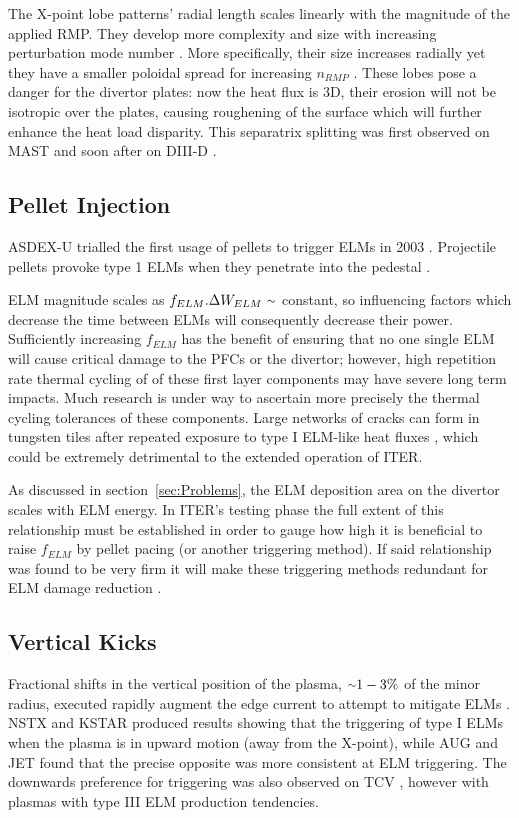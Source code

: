 \documentclass[12pt]{article}  %
\providecommand{\squiggle}{\raise.17ex\hbox{$\scriptstyle\sim$}} %
\begin{document}
The X-point lobe patterns' radial length scales linearly with the magnitude of the applied RMP. They develop more complexity and size with increasing perturbation mode number \cite{Harrison2014}. More specifically, their size increases radially yet they have a smaller poloidal spread for increasing $n_{RMP}$ \cite{Chapman2014}. These lobes pose a danger for the divertor plates: now the heat flux is 3D, their erosion will not be isotropic over the plates, causing roughening of the surface which will further enhance the heat load disparity. This separatrix splitting was first observed on MAST \cite{Kirk2012} and soon after on DIII-D \cite{Shafer2012}.

\subsection{Pellet Injection}\label{ssec:PInjection}
ASDEX-U trialled the first usage of pellets to trigger ELMs in 2003 \cite{Lang2003}. Projectile pellets provoke type 1 ELMs when they penetrate into the pedestal \cite{KirkFF}.

ELM magnitude scales as $f_{ELM}.\Delta W_{ELM}~\squiggle$ constant\cite{Loarte2002,Leonard1999,KirkFF}, so influencing factors which decrease the time between ELMs will consequently decrease their power. Sufficiently increasing $f_{ELM}$ has the benefit of ensuring that no one single ELM will cause critical damage to the PFCs or the divertor; however, high repetition rate thermal cycling of of these first layer components may have severe long term impacts. Much research is under way to ascertain more precisely the thermal cycling tolerances of these components. Large networks of cracks can form in tungsten tiles after repeated exposure to type I ELM-like heat fluxes \cite{Linke2011}, which could be extremely detrimental to the extended operation of ITER.

As discussed in section~\ref{sec:Problems}, the ELM deposition area on the divertor scales with ELM energy. In ITER's testing phase the full extent of this relationship must be established in order to gauge how high it is beneficial to raise $f_{ELM}$ by pellet pacing (or another triggering method). If said relationship was found to be very firm it will make these triggering methods redundant for ELM damage reduction \cite{Lang2013}.



\subsection{Vertical Kicks}\label{ssec:Vkicks}
Fractional shifts in the vertical position of the plasma, $\squiggle 1-3\%$ of the minor radius\cite{KirkFF}, executed rapidly augment the edge current to attempt to mitigate ELMs \cite{DelaLuna2016}. NSTX \cite{Gerhardt2010} and KSTAR \cite{Kim2012} produced results showing that the triggering of type I ELMs when the plasma is in upward motion (away from the X-point), while AUG \cite{Lang2004} and JET \cite{DelaLuna2016} found that the precise opposite was more consistent at ELM triggering. The downwards preference for triggering was also observed on TCV \cite{Degeling2003}, however with plasmas with type III ELM production tendencies.
\end{document}
